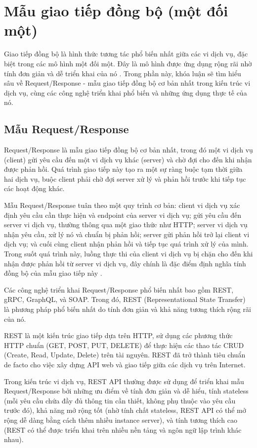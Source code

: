 \section{Mẫu giao tiếp đồng bộ (một đối một)}
Giao tiếp đồng bộ là hình thức tương tác phổ biến nhất giữa các vi dịch vụ, đặc biệt trong các mô hình một đối một. Đây là mô hình được ứng dụng rộng rãi nhờ tính đơn giản và dễ triển khai của nó \cite{newman2015}. Trong phần này, khóa luận sẽ tìm hiểu sâu về Request/Response - mẫu giao tiếp đồng bộ cơ bản nhất trong kiến trúc vi dịch vụ, cùng các công nghệ triển khai phổ biến và những ứng dụng thực tế của nó.

\subsection{Mẫu Request/Response}
Request/Response là mẫu giao tiếp đồng bộ cơ bản nhất, trong đó một vi dịch vụ (client) gửi yêu cầu đến một vi dịch vụ khác (server) và chờ đợi cho đến khi nhận được phản hồi. Quá trình giao tiếp này tạo ra một sự ràng buộc tạm thời giữa hai dịch vụ, buộc client phải chờ đợi server xử lý và phản hồi trước khi tiếp tục các hoạt động khác.

Mẫu Request/Response tuân theo một quy trình cơ bản: client vi dịch vụ xác định yêu cầu cần thực hiện và endpoint của server vi dịch vụ; gửi yêu cầu đến server vi dịch vụ, thường thông qua một giao thức như HTTP; server vi dịch vụ nhận yêu cầu, xử lý nó và chuẩn bị phản hồi; server gửi phản hồi trở lại client vi dịch vụ; và cuối cùng client nhận phản hồi và tiếp tục quá trình xử lý của mình. Trong suốt quá trình này, luồng thực thi của client vi dịch vụ bị chặn cho đến khi nhận được phản hồi từ server vi dịch vụ, đây chính là đặc điểm định nghĩa tính đồng bộ của mẫu giao tiếp này \cite{newman2015}.

Các công nghệ triển khai Request/Response phổ biến nhất bao gồm REST, gRPC, GraphQL, và SOAP. Trong đó, REST (Representational State Transfer) là phương pháp phổ biến nhất do tính đơn giản và khả năng tương thích rộng rãi của nó.

REST là một kiến trúc giao tiếp dựa trên HTTP, sử dụng các phương thức HTTP chuẩn (GET, POST, PUT, DELETE) để thực hiện các thao tác CRUD (Create, Read, Update, Delete) trên tài nguyên. REST đã trở thành tiêu chuẩn de facto cho việc xây dựng API web và giao tiếp giữa các dịch vụ trên Internet.

Trong kiến trúc vi dịch vụ, REST API thường được sử dụng để triển khai mẫu Request/Response bởi những ưu điểm về tính đơn giản và dễ hiểu, tính stateless (mỗi yêu cầu chứa đầy đủ thông tin cần thiết, không phụ thuộc vào yêu cầu trước đó), khả năng mở rộng tốt (nhờ tính chất stateless, REST API có thể mở rộng dễ dàng bằng cách thêm nhiều instance server), và tính tương thích cao (REST có thể được triển khai trên nhiều nền tảng và ngôn ngữ lập trình khác nhau).

